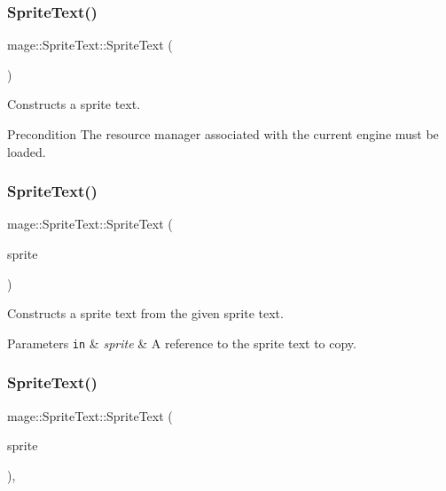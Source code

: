 \subsubsection{\texorpdfstring{Sprite\+Text()}{SpriteText()}\hspace{0.1cm}{\footnotesize\ttfamily [1/3]}}
{\footnotesize\ttfamily mage\+::\+Sprite\+Text\+::\+Sprite\+Text (\begin{DoxyParamCaption}{ }\end{DoxyParamCaption})}

Constructs a sprite text.

\begin{DoxyPrecond}{Precondition}
The resource manager associated with the current engine must be loaded. 
\end{DoxyPrecond}
\hypertarget{classmage_1_1_sprite_text_a6dce7aa2dfa9d63d11e37e41acf82e52}{}\label{classmage_1_1_sprite_text_a6dce7aa2dfa9d63d11e37e41acf82e52} 
\subsubsection{\texorpdfstring{Sprite\+Text()}{SpriteText()}\hspace{0.1cm}{\footnotesize\ttfamily [2/3]}}
{\footnotesize\ttfamily mage\+::\+Sprite\+Text\+::\+Sprite\+Text (\begin{DoxyParamCaption}\item[{const \hyperlink{classmage_1_1_sprite_text}{Sprite\+Text} \&}]{sprite }\end{DoxyParamCaption})\hspace{0.3cm}{\ttfamily [default]}}

Constructs a sprite text from the given sprite text.


\begin{DoxyParams}[1]{Parameters}
\mbox{\tt in}  & {\em sprite} & A reference to the sprite text to copy. \\
\hline
\end{DoxyParams}
\hypertarget{classmage_1_1_sprite_text_a4a5292d05ad76644d9b914cdc26ce4d6}{}\label{classmage_1_1_sprite_text_a4a5292d05ad76644d9b914cdc26ce4d6} 
\subsubsection{\texorpdfstring{Sprite\+Text()}{SpriteText()}\hspace{0.1cm}{\footnotesize\ttfamily [3/3]}}
{\footnotesize\ttfamily mage\+::\+Sprite\+Text\+::\+Sprite\+Text (\begin{DoxyParamCaption}\item[{\hyperlink{classmage_1_1_sprite_text}{Sprite\+Text} \&\&}]{sprite }\end{DoxyParamCaption})\hspace{0.3cm}{\ttfamily [default]}, {\ttfamily [noexcept]}}


